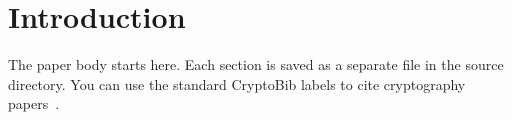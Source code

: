 \section{Introduction}

The paper body starts here. Each section is saved as a separate file in the source directory. You can use the standard CryptoBib labels to cite cryptography papers~\cite{C:Shamir85}. 